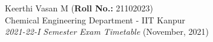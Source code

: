 \documentclass[10pt]{article}
\begin{document}
\pagestyle{empty} 
\setlength{\parindent}{0pt}
\begin{center}
    Keerthi Vasan M (\textbf{Roll No.:} 21102023)\\
    Chemical Engineering Department - IIT Kanpur\\
    \textit{2021-22-I Semester Exam Timetable} (November, 2021)
\end{center}


\begin{calendar}{\textwidth} %





\BlankDay



\end{calendar}
\end{document}
